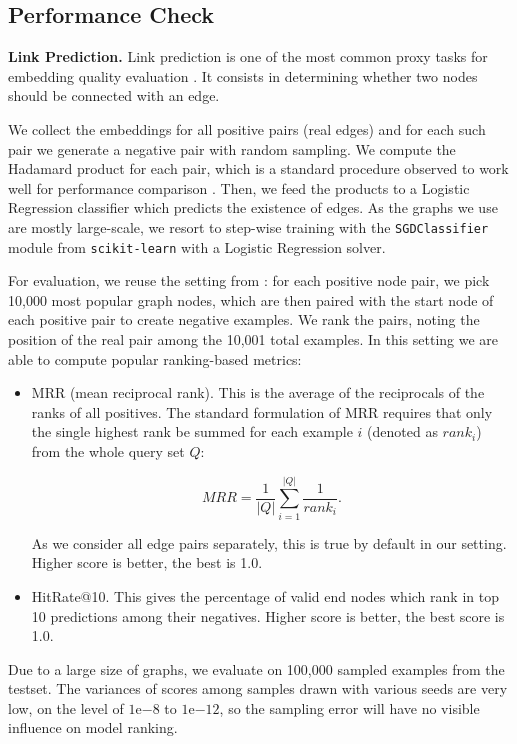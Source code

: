 \documentclass{IEEEtran}
\begin{document}
\subsection{Performance Check}
\textbf{Link Prediction.}
Link prediction is one of the most common proxy tasks for embedding quality evaluation \cite{liben2007link}. It consists in determining whether two nodes should be connected with an edge. 



 We collect the embeddings for all positive pairs (real edges) and for each such pair we generate a negative pair with random sampling. We compute the Hadamard product for each pair, which is a standard procedure observed to work well for performance comparison \cite{grover2016node2vec, 10.1145/3184558.3191523}. Then, we feed the products to a Logistic Regression classifier which predicts the existence of edges. As the graphs we use are mostly large-scale, we resort to step-wise training with the \texttt{SGDClassifier} module from \texttt{scikit-learn} with a Logistic Regression solver.
 
 For evaluation, we reuse the setting from \cite{pbg}: for each positive  node pair, we pick 10,000 most popular graph nodes, which are then paired with the start node of each positive pair to create negative examples. We rank the pairs, noting the position of the real pair among the 10,001 total examples. In this setting we are able to compute popular ranking-based metrics:
\begin{itemize}
    \item MRR (mean reciprocal rank). This is the average of the reciprocals of the ranks of all positives. The standard formulation of MRR requires that only the single highest rank be summed for each example $i$ (denoted as $rank_i$) from the whole query set $Q$:

        $$ MRR = \frac{1}{|Q|} \sum_{i=1}^{|Q|}{\frac{1}{rank_i}}. $$ 

    As we consider all edge pairs separately, this is true by default in our setting. Higher score is better, the best is 1.0.
    
    \item HitRate@10. This gives the percentage of valid end nodes which rank in top 10 predictions among their negatives. Higher score is better, the best score is 1.0.
\end{itemize}

Due to a large size of graphs, we evaluate on 100,000 sampled examples from the testset. The variances of scores among  samples drawn with various seeds are very low, on the level of $1\mathrm{e}{-8}$ to $1\mathrm{e}{-12}$, so the sampling error will have no visible influence on model ranking.
\end{document}
